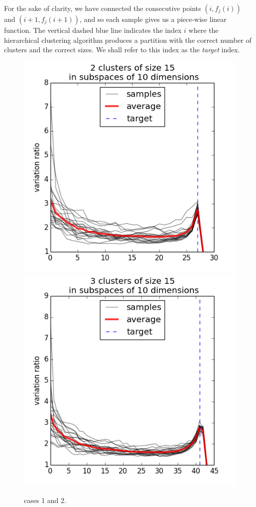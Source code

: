 \documentclass[12pt]{article}
\begin{document}
For the sake of clarity, we have connected the consecutive points $(i, f_j(i))$ and $(i+1, f_j(i+1))$, and so each sample gives us a piece-wise linear function.  The vertical dashed blue line indicates the index $i$ where the hierarchical clustering algorithm produces a partition with the correct number of clusters and the correct sizes. We shall refer to this index as the \emph{target} index.
\begin{figure}[H]
    \includegraphics[width=0.50 \textwidth]{2c_s15_sbs10}
    \includegraphics[width=0.50 \textwidth]{3c_s15_sbs10}
    \caption{cases 1 and 2.}
\end{figure}
\end{document}
